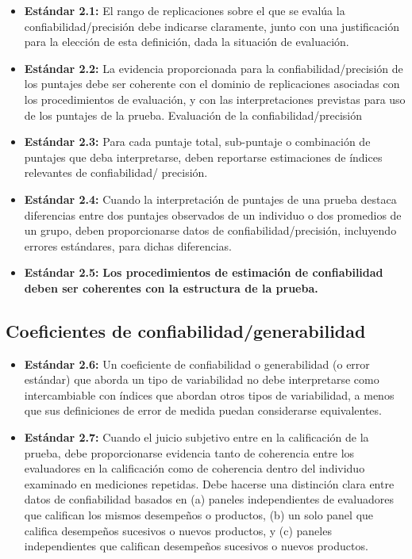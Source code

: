 \documentclass[
  letterpaper,
  DIV=11,
  numbers=noendperiod]{scrreprt}
\providecommand{\tightlist}{%
  \setlength{\itemsep}{0pt}\setlength{\parskip}{0pt}}
\begin{document}
\begin{itemize}
\tightlist
\item
  \textbf{Estándar 2.1:} El rango de replicaciones sobre el que se
  evalúa la confiabilidad/precisión debe indicarse claramente, junto con
  una justificación para la elección de esta definición, dada la
  situación de evaluación.
\item
  \textbf{Estándar 2.2:} La evidencia proporcionada para la
  confiabilidad/precisión de los puntajes debe ser coherente con el
  dominio de replicaciones asociadas con los procedimientos de
  evaluación, y con las interpretaciones previstas para uso de los
  puntajes de la prueba. Evaluación de la confiabilidad/precisión
\item
  \textbf{Estándar 2.3:} Para cada puntaje total, sub-puntaje o
  combinación de puntajes que deba interpretarse, deben reportarse
  estimaciones de índices relevantes de confiabilidad/ precisión.
\item
  \textbf{Estándar 2.4:} Cuando la interpretación de puntajes de una
  prueba destaca diferencias entre dos puntajes observados de un
  individuo o dos promedios de un grupo, deben proporcionarse datos de
  confiabilidad/precisión, incluyendo errores estándares, para dichas
  diferencias.
\item
  \textbf{Estándar 2.5:} \textbf{Los procedimientos de estimación de
  confiabilidad deben ser coherentes con la estructura de la prueba.}
\end{itemize}

\subsection{Coeficientes de
confiabilidad/generabilidad}\label{coeficientes-de-confiabilidadgenerabilidad}

\begin{itemize}
\tightlist
\item
  \textbf{Estándar 2.6:} Un coeficiente de confiabilidad o generabilidad
  (o error estándar) que aborda un tipo de variabilidad no debe
  interpretarse como intercambiable con índices que abordan otros tipos
  de variabilidad, a menos que sus definiciones de error de medida
  puedan considerarse equivalentes.
\item
  \textbf{Estándar 2.7:} Cuando el juicio subjetivo entre en la
  calificación de la prueba, debe proporcionarse evidencia tanto de
  coherencia entre los evaluadores en la calificación como de coherencia
  dentro del individuo examinado en mediciones repetidas. Debe hacerse
  una distinción clara entre datos de confiabilidad basados en (a)
  paneles independientes de evaluadores que califican los mismos
  desempeños o productos, (b) un solo panel que califica desempeños
  sucesivos o nuevos productos, y (c) paneles independientes que
  califican desempeños sucesivos o nuevos productos.
\end{itemize}
\end{document}
